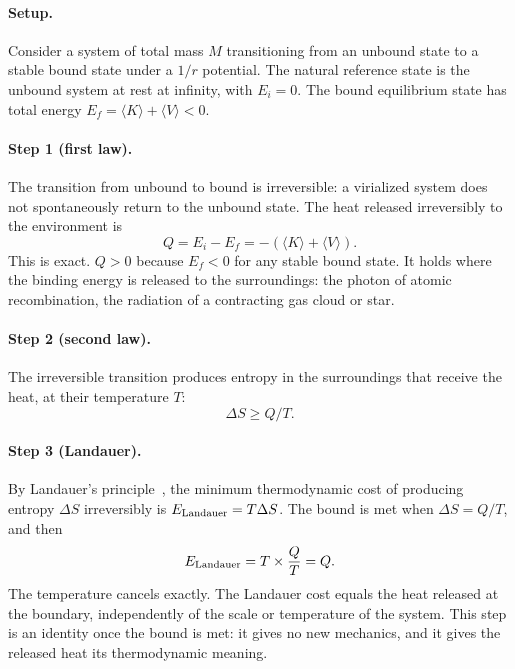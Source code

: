 \paragraph{Setup.} Consider a system of total mass $M$ transitioning from an unbound state to a stable bound state under a $1/r$ potential. The natural
reference state is the unbound system at rest at infinity, with $E_i=0$. The bound equilibrium state has total energy
$E_f=\langle K\rangle+\langle V\rangle<0$.

\paragraph{Step 1 (first law).} The transition from unbound to bound is irreversible: a virialized system does not spontaneously return to the unbound
state. The heat released irreversibly to the environment is
\begin{equation}
Q=E_i-E_f=-(\langle K\rangle+\langle V\rangle).\label{eq:vi_Q}
\end{equation}
This is exact. $Q>0$ because $E_f<0$ for any stable bound state. It holds where the binding energy is released to the surroundings: the photon of atomic
recombination, the radiation of a contracting gas cloud or star. \derived{}

\paragraph{Step 2 (second law).} The irreversible transition produces entropy in the surroundings that receive the heat, at their temperature $T$:
\begin{equation}
\Delta S\ge Q/T .\label{eq:vi_dS}
\end{equation} \derived{}

\paragraph{Step 3 (Landauer).} By Landauer's principle~\cite{Landauer1961}, the minimum thermodynamic cost of producing entropy $\Delta S$ irreversibly is
$E_{\rm Landauer}=T\Delta S$. The bound is met when $\Delta S=Q/T$, and then
\begin{equation}
E_{\rm Landauer}=T\times\frac QT=Q .\label{eq:vi_EL}
\end{equation}
The temperature cancels exactly. The Landauer cost equals the heat released at the boundary, independently of the scale or temperature of the system.
This step is an identity once the bound is met: it gives no new mechanics, and it gives the released heat its thermodynamic meaning. \derived{}

